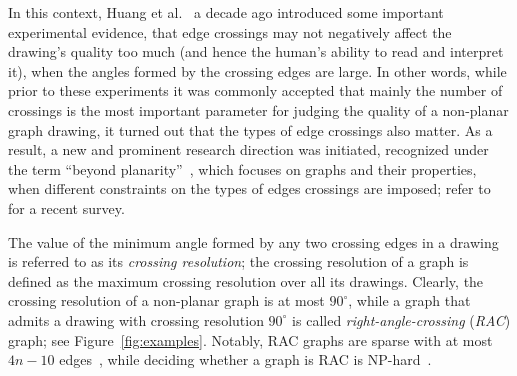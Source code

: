 \documentclass[runningheads]{llncs}
\begin{document}
In this context, Huang et al.~\cite{DBLP:conf/apvis/Huang07,DBLP:journals/vlc/HuangEH14} a decade ago introduced some important experimental evidence,
that edge crossings may not negatively affect the drawing's quality too much (and hence the human's ability to read and interpret it), when the angles formed by the crossing edges are large. In other words, while prior to these experiments it was commonly accepted that mainly the number of crossings is the most important parameter for judging the quality of a non-planar graph drawing, it turned out that the types of edge crossings also matter. As a result, a new and prominent research direction was initiated, recognized under the term ``beyond planarity''~\cite{Shonan2016,Dagstuhl2016,SoCG2017}, which focuses on graphs and their properties, when different constraints on the types of edges crossings are imposed; refer to~\cite{DBLP:journals/corr/abs-1804-07257} for a recent survey.

The value of the minimum angle formed by any two crossing edges in a drawing is referred to as its \emph{crossing resolution}; the crossing resolution of a graph is defined as the maximum crossing resolution over all its drawings. Clearly, the crossing resolution of a non-planar graph is at most $90^\circ$, while a graph that admits a drawing with crossing resolution $90^\circ$ is called \emph{right-angle-crossing} (\emph{RAC}) graph; see Figure~\ref{fig:examples}. Notably, RAC graphs are sparse with at most $4n-10$ edges~\cite{DBLP:journals/tcs/DidimoEL11}, while deciding whether a graph is RAC is NP-hard~\cite{DBLP:journals/jgaa/ArgyriouBS12}.
\end{document}
